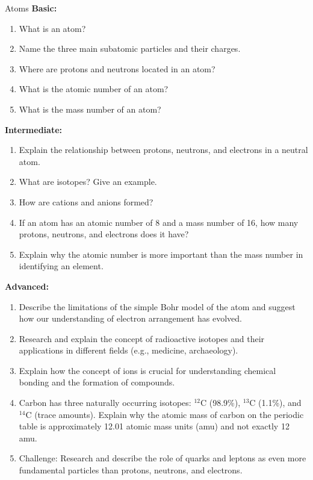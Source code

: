 \begin{tieredquestions}{Atoms}
\textbf{Basic:}
\begin{enumerate}
    \item What is an atom?
    \item Name the three main subatomic particles and their charges.
    \item Where are protons and neutrons located in an atom?
    \item What is the atomic number of an atom?
    \item What is the mass number of an atom?
\end{enumerate}

\textbf{Intermediate:}
\begin{enumerate}
    \item Explain the relationship between protons, neutrons, and electrons in a neutral atom.
    \item What are isotopes? Give an example.
    \item How are cations and anions formed?
    \item If an atom has an atomic number of 8 and a mass number of 16, how many protons, neutrons, and electrons does it have?
    \item Explain why the atomic number is more important than the mass number in identifying an element.
\end{enumerate}

\textbf{Advanced:}
\begin{enumerate}
    \item Describe the limitations of the simple Bohr model of the atom and suggest how our understanding of electron arrangement has evolved.
    \item Research and explain the concept of radioactive isotopes and their applications in different fields (e.g., medicine, archaeology).
    \item Explain how the concept of ions is crucial for understanding chemical bonding and the formation of compounds.
    \item Carbon has three naturally occurring isotopes: $^{12}\text{C}$ (98.9\%), $^{13}\text{C}$ (1.1\%), and $^{14}\text{C}$ (trace amounts).  Explain why the atomic mass of carbon on the periodic table is approximately 12.01 atomic mass units (amu) and not exactly 12 amu.
    \item  Challenge: Research and describe the role of quarks and leptons as even more fundamental particles than protons, neutrons, and electrons.
\end{enumerate}
\end{tieredquestions}


